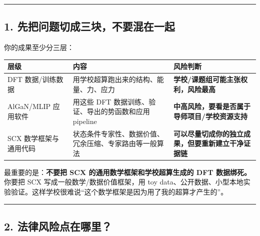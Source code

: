 \documentclass[
  12pt,
]{ctexart}
\begin{document}
\begin{center}\rule{0.5\linewidth}{0.5pt}\end{center}

\subsection{1.
先把问题切成三块，不要混在一起}\label{ux5148ux628aux95eeux9898ux5207ux6210ux4e09ux5757ux4e0dux8981ux6df7ux5728ux4e00ux8d77}

你的成果至少分三层：

\begin{longtable}[]{@{}
  >{\raggedright\arraybackslash}p{}
  >{\raggedright\arraybackslash}p{}
  >{\raggedright\arraybackslash}p{}@{}}
\toprule\noalign{}
\begin{minipage}[b]{\linewidth}\raggedright
层级
\end{minipage} & \begin{minipage}[b]{\linewidth}\raggedright
内容
\end{minipage} & \begin{minipage}[b]{\linewidth}\raggedright
风险判断
\end{minipage} \\
\midrule\noalign{}
\endhead
\bottomrule\noalign{}
\endlastfoot
DFT 数据/训练数据 & 用学校超算跑出来的结构、能量、力、应力 &
\textbf{学校/课题组可能主张权利，风险最高} \\
AlGaN/MLIP 应用软件 & 用这些 DFT 数据训练、验证、导出的势函数和应用
pipeline & \textbf{中高风险，要看是否属于导师项目/学校资源支持} \\
SCX 数学框架与通用代码 &
状态条件专家性、数据价值、冗余压缩、专家路由等一般算法 &
\textbf{可以尽量切成你的独立成果，但要重新建立干净证据链} \\
\end{longtable}

最重要的是：\textbf{不要把 SCX 的通用数学框架和学校超算生成的 DFT
数据绑死。} 你要把 SCX 写成一般数学/数据价值框架，用 toy
data、公开数据、小型本地实验验证。这样学校很难说``这个数学框架是因为用了我的超算才产生的''。

\begin{center}\rule{0.5\linewidth}{0.5pt}\end{center}

\subsection{2.
法律风险点在哪里？}\label{ux6cd5ux5f8bux98ceux9669ux70b9ux5728ux54eaux91cc}
\end{document}
